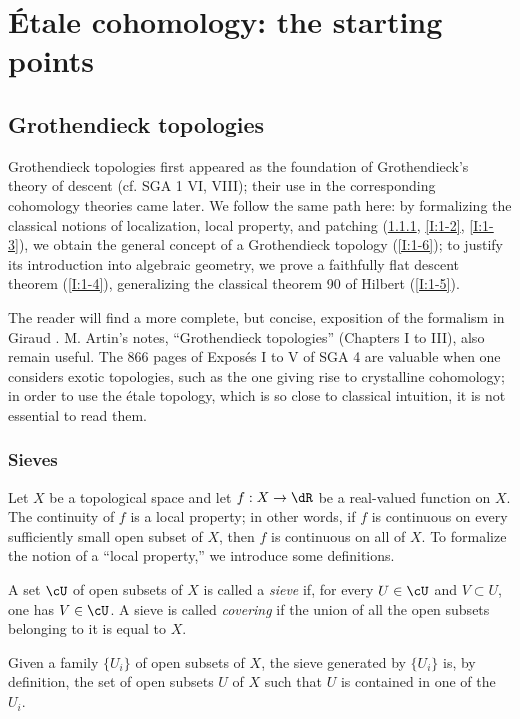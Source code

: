 
\chapter{Étale cohomology: the starting points}\label{I}

\section{Grothendieck topologies}\label{I:1}

Grothendieck topologies first appeared as the foundation of Grothendieck's
theory of descent (cf. SGA 1 VI, VIII); their use in the corresponding
cohomology theories came later. We follow the same path here: by formalizing
the classical notions of localization, local property, and patching
(\ref{I:1-1}, \ref{I:1-2}, \ref{I:1-3}), we obtain the general concept of a
Grothendieck topology (\ref{I:1-6}); to justify its introduction into
algebraic geometry, we prove a faithfully flat descent theorem
(\ref{I:1-4}), generalizing the classical theorem 90 of Hilbert
(\ref{I:1-5}).

The reader will find a more complete, but concise, exposition of the
formalism in Giraud \cite{gi64}. M. Artin's notes, “Grothendieck
topologies” \cite{ar62} (Chapters I to III), also remain useful. The
866 pages of Exposés I to V of SGA 4 are valuable when one considers exotic
topologies, such as the one giving rise to crystalline cohomology; in order
to use the étale topology, which is so close to classical intuition, it is
not essential to read them.

\subsection{Sieves}\label{I:1-1}

Let $X$ be a topological space and let $f:X\to \dR$ be a real-valued
function on $X$. The continuity of $f$ is a local property; in other words,
if $f$ is continuous on every sufficiently small open subset of $X$, then
$f$ is continuous on all of $X$. To formalize the notion of a “local
property,” we introduce some definitions.

A set $\cU$ of open subsets of $X$ is called a \emph{sieve} if, for every
$U\in\cU$ and $V\subset U$, one has $V\in\cU$. A sieve is called
\emph{covering} if the union of all the open subsets belonging to it is
equal to $X$.

Given a family $\{U_i\}$ of open subsets of $X$, the sieve generated by
$\{U_i\}$ is, by definition, the set of open subsets $U$ of $X$ such that
$U$ is contained in one of the $U_i$.

